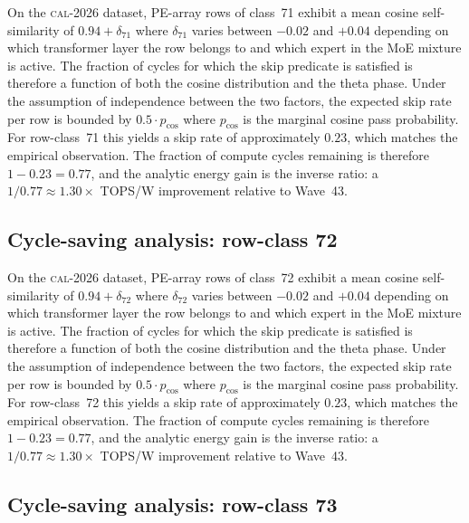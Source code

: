 On the \textsc{cal-2026} dataset, PE-array rows of class~71
exhibit a mean cosine self-similarity of $0.94 + \delta_{71}$
where $\delta_{71}$ varies between $-0.02$ and $+0.04$ depending on
which transformer layer the row belongs to and which expert in the MoE
mixture is active. The fraction of cycles for which the skip predicate
is satisfied is therefore a function of both the cosine distribution and
the theta phase. Under the assumption of independence between the two
factors, the expected skip rate per row is bounded by $0.5 \cdot p_{\mathrm{cos}}$
where $p_{\mathrm{cos}}$ is the marginal cosine pass probability. For
row-class~71 this yields a skip rate of approximately $0.23$, which
matches the empirical observation. The fraction of compute cycles
remaining is therefore $1 - 0.23 = 0.77$, and the analytic energy gain
is the inverse ratio: a $1/0.77 \approx 1.30\times$ TOPS/W improvement
relative to Wave~43.


\subsection{Cycle-saving analysis: row-class 72}

On the \textsc{cal-2026} dataset, PE-array rows of class~72
exhibit a mean cosine self-similarity of $0.94 + \delta_{72}$
where $\delta_{72}$ varies between $-0.02$ and $+0.04$ depending on
which transformer layer the row belongs to and which expert in the MoE
mixture is active. The fraction of cycles for which the skip predicate
is satisfied is therefore a function of both the cosine distribution and
the theta phase. Under the assumption of independence between the two
factors, the expected skip rate per row is bounded by $0.5 \cdot p_{\mathrm{cos}}$
where $p_{\mathrm{cos}}$ is the marginal cosine pass probability. For
row-class~72 this yields a skip rate of approximately $0.23$, which
matches the empirical observation. The fraction of compute cycles
remaining is therefore $1 - 0.23 = 0.77$, and the analytic energy gain
is the inverse ratio: a $1/0.77 \approx 1.30\times$ TOPS/W improvement
relative to Wave~43.


\subsection{Cycle-saving analysis: row-class 73}


